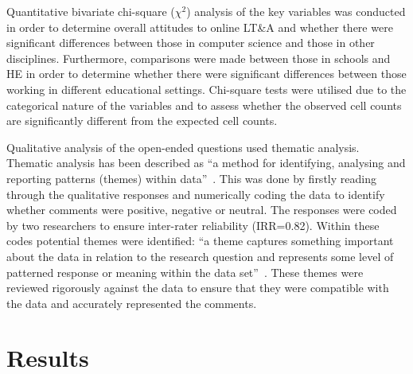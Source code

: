 \documentclass[sigconf]{acmart}
\begin{document}
Quantitative bivariate chi-square ($\chi^2$) analysis of the key
variables was conducted in order to determine overall attitudes to
online LT\&A and whether there were significant differences between
those in computer science and those in other disciplines. Furthermore,
comparisons were made between those in schools and HE in order to
determine whether there were significant differences between those
working in different educational settings. Chi-square tests were
utilised due to the categorical nature of the variables and to assess
whether the observed cell counts are significantly different from the
expected cell counts.


Qualitative analysis of the open-ended questions used thematic
analysis. Thematic analysis has been described as ``a method for
identifying, analysing and reporting patterns (themes) within
data''~\cite{braun+clarke:2006}. This was done by firstly reading
through the qualitative responses and numerically coding the data to
identify whether comments were positive, negative or neutral. The
responses were coded by two researchers to ensure inter-rater
reliability (IRR=0.82). Within these codes potential themes were
identified: ``a theme captures something important about the data in
relation to the research question and represents some level of
patterned response or meaning within the data
set''~\cite[p.82]{braun+clarke:2006}. These themes were reviewed
rigorously against the data to ensure that they were compatible with
the data and accurately represented the comments.

\section{Results}\label{results}
\end{document}
